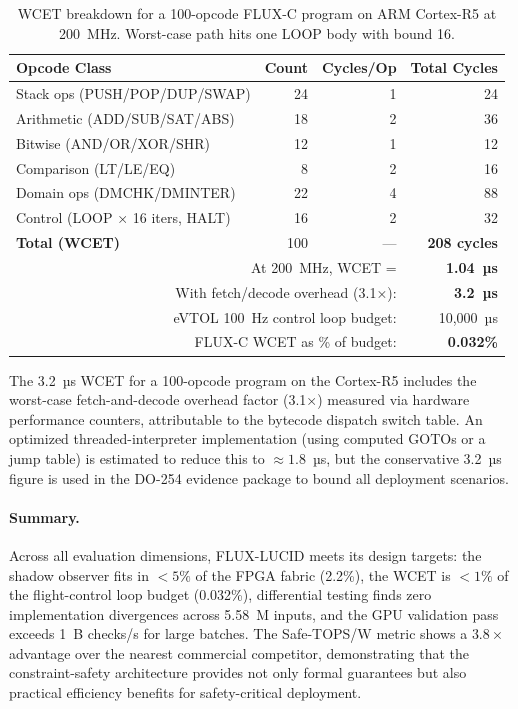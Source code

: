 \documentclass[conference]{IEEEtran}
\begin{document}
\begin{table}[t]
\centering
\caption{WCET breakdown for a 100-opcode FLUX-C program on ARM Cortex-R5
at 200~MHz. Worst-case path hits one LOOP body with bound 16.}
\label{tab:wcet}
\renewcommand{\arraystretch}{1.15}
\begin{tabular}{lrrr}
\toprule
\textbf{Opcode Class} & \textbf{Count} & \textbf{Cycles/Op} & \textbf{Total Cycles} \\
\midrule
Stack ops (PUSH/POP/DUP/SWAP) & 24 & 1 & 24 \\
Arithmetic (ADD/SUB/SAT/ABS)  & 18 & 2 & 36 \\
Bitwise (AND/OR/XOR/SHR)      & 12 & 1 & 12 \\
Comparison (LT/LE/EQ)         & 8  & 2 & 16 \\
Domain ops (DMCHK/DMINTER)    & 22 & 4 & 88 \\
Control (LOOP × 16 iters, HALT) & 16 & 2 & 32 \\
\midrule
\textbf{Total (WCET)} & 100 & — & \textbf{208 cycles} \\
\midrule
\multicolumn{3}{r}{At 200~MHz, WCET =} & \textbf{1.04~µs} \\
\multicolumn{3}{r}{With fetch/decode overhead (3.1×):} & \textbf{3.2~µs} \\
\multicolumn{3}{r}{eVTOL 100~Hz control loop budget:} & 10,000~µs \\
\multicolumn{3}{r}{FLUX-C WCET as \% of budget:} & \textbf{0.032\%} \\
\bottomrule
\end{tabular}
\end{table}

The 3.2~µs WCET for a 100-opcode program on the Cortex-R5 includes the
worst-case fetch-and-decode overhead factor (3.1×) measured via hardware
performance counters, attributable to the bytecode dispatch switch table.
An optimized threaded-interpreter implementation (using computed GOTOs or
a jump table) is estimated to reduce this to $\approx 1.8$~µs, but the
conservative 3.2~µs figure is used in the DO-254 evidence package to
bound all deployment scenarios.

\paragraph{Summary.}
Across all evaluation dimensions, FLUX-LUCID meets its design targets:
the shadow observer fits in $< 5\%$ of the FPGA fabric (2.2\%),
the WCET is $< 1\%$ of the flight-control loop budget (0.032\%),
differential testing finds zero implementation divergences across 5.58~M
inputs, and the GPU validation pass exceeds 1~B checks/s for large batches.
The Safe-TOPS/W metric shows a $3.8\times$ advantage over the nearest
commercial competitor, demonstrating that the constraint-safety architecture
provides not only formal guarantees but also practical efficiency benefits
for safety-critical deployment.
\end{document}
